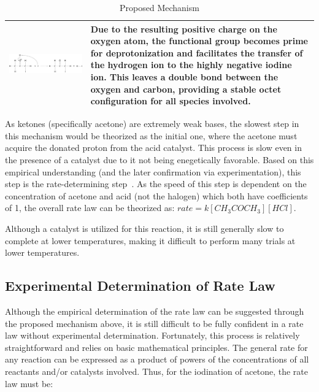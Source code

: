 \begin{table}[h!]
\begin{tabular}{m{6cm} m{10cm}}
 \midrule
  \includegraphics[width=.35\textwidth]{fig/images/mechanism/deprotonization.pdf} & Due to the resulting positive charge on the oxygen atom, the functional group becomes prime for deprotonization and facilitates the transfer of the hydrogen ion to the highly negative iodine ion. This leaves a double bond between the oxygen and carbon, providing a stable octet configuration for all species involved. \TBstrut\\
  \bottomrule
\end{tabular}
\caption{Proposed Mechanism}
\label{table:suggested_mechanism}
\end{table}

As ketones (specifically acetone) are extremely weak bases, the slowest step in this mechanism would be theorized as the initial one, where the acetone must acquire the donated proton from the acid catalyst. This process is slow even in the presence of a catalyst due to it not being enegetically favorable. Based on this empirical understanding (and the later confirmation via experimentation), this step is the rate-determining step~\parencite{alternative_approach_1}. As the speed of this step is dependent on the concentration of acetone and acid (not the halogen) which both have coefficients of 1, the overall rate law can be theorized as: $rate = k[CH_3COCH_3][HCl]$.

Although a catalyst is utilized for this reaction, it is still generally slow to complete at lower temperatures, making it difficult to perform many trials at lower temperatures. 

\subsection{Experimental Determination of Rate Law}

Although the empirical determination of the rate law can be suggested through the proposed mechanism above, it is still difficult to be fully confident in a rate law without experimental determination. Fortunately, this process is relatively straightforward and relies on basic mathematical principles. The general rate for any reaction can be expressed as a product of powers of the concentrations of all reactants and/or catalysts involved. Thus, for the iodination of acetone, the rate law must be:

